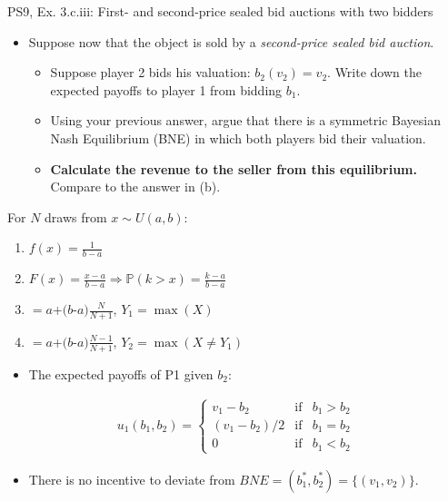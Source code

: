\begin{frame}{PS9, Ex. 3.c.iii: First- and second-price sealed bid auctions with two bidders}
    \begin{multicols}{2}
      \begin{itemize}
        \item[(c)] Suppose now that the object is sold by a \textit{second-price sealed bid auction}.
        \begin{itemize}\normalsize
          \item[i.]   Suppose player 2 bids his valuation: $b_2(v_2) = v_2$. Write down the expected payoffs to player 1 from bidding $b_1$.
          \item[ii.]  Using your previous answer, argue that there is a symmetric Bayesian Nash Equilibrium (BNE) in which both players bid their valuation.
          \item[iii.] \textbf{Calculate the revenue to the seller from this equilibrium.} Compare to the answer in (b).
        \end{itemize}
      \end{itemize}
      For $N$ draws from $x\sim U(a, b):$
      \vspace{-6pt}
      \begin{enumerate}
        \item[PDF:] $f(x)=\frac{1}{b-a}$
        \item[CDF:] $F(x)=\frac{x-a}{b-a}\Rightarrow\mathbb{P}(k>x)=\frac{k-a}{b-a}$
        \item[$\mathbb{E}(Y_1)$] $=a$+$(b$-$a)\frac{N}{N+1}$, $Y_1=\max(X)$
        \item[$\mathbb{E}(Y_2)$] $=a$+$(b$-$a)\frac{N-1}{N+1}$, $Y_2=\max(X\neq Y_1)$
      \end{enumerate}
      \vfill\null\columnbreak
      \begin{itemize}
        \item[(i)] The expected payoffs of P1 given $b_2$:
      \end{itemize}
      \vspace{-16pt}
      \begin{align*}
        u_1(b_1,b_2)=\left\{\begin{array}{lcl}
          v_1-b_2     & \text{if} & b_1>b_2 \\
          (v_1-b_2)/2 & \text{if} & b_1=b_2 \\
          0           & \text{if} & b_1<b_2
        \end{array}\right.
      \end{align*}
      \vspace{-18pt}
      \begin{itemize}
        \item[(ii)] There is no incentive to deviate from $BNE=(b_1^*,b_2^*)=\{(v_1,v_2)\}$.
      \end{itemize}
      \vfill\null
    \end{multicols}
\end{frame}
